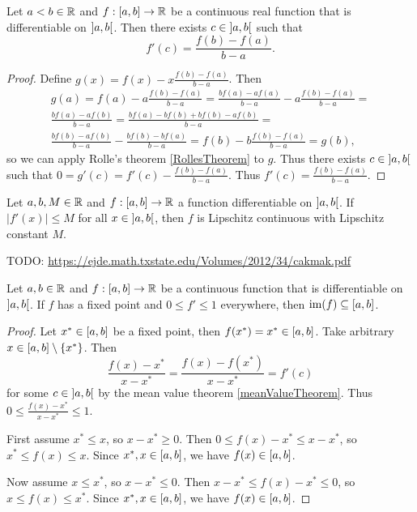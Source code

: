 \begin{theorem} \label{meanValueTheorem}
Let $a<b\in \mathbb{R}$ and $f: \interval{a,b}\to \R$ be a continuous real function that is differentiable on $\interval[o]{a,b}$. Then there exists $c\in \interval[o]{a,b}$ such that
\[f'(c) = \frac{f(b)-f(a)}{b-a}. \]
\end{theorem}
\begin{proof}
Define $g(x) = f(x) - x\frac{f(b)-f(a)}{b-a}$. Then
\begin{multline*}
g(a) = f(a) - a\frac{f(b)-f(a)}{b-a} = \frac{bf(a) - af(a)}{b-a} - a\frac{f(b)-f(a)}{b-a} = \\ \frac{bf(a)-af(b)}{b-a} = \frac{bf(a)-bf(b) + bf(b)-af(b)}{b-a} = \\ \frac{bf(b) - af(b)}{b-a} - \frac{bf(b) - bf(a)}{b-a} = f(b) - b \frac{f(b)-f(a)}{b-a} = g(b),
\end{multline*}
so we can apply Rolle's theorem \ref{RollesTheorem} to $g$. Thus there exists $c\in \interval[o]{a,b}$ such that $0 = g'(c) = f'(c) - \frac{f(b)-f(a)}{b-a}$. Thus $f'(c) = \frac{f(b)-f(a)}{b-a}$.
\end{proof}
\begin{corollary}
Let $a,b, M\in \mathbb{R}$ and $f:\interval{a,b}\to \R$ a function differentiable on $\interval[o]{a,b}$. If $|f'(x)| \leq M$ for all $x\in \interval[o]{a,b}$, then $f$ is Lipschitz continuous with Lipschitz constant $M$.
\end{corollary}

TODO: \url{https://ejde.math.txstate.edu/Volumes/2012/34/cakmak.pdf}

\begin{lemma} \label{boundDerivativeAndFixedPointGivesRange}
Let $a,b\in \mathbb{R}$ and $f:\interval{a,b}\to \R$ be a continuous function that is differentiable on $\interval[o]{a,b}$. If $f$ has a fixed point and $0\leq f' \leq 1$ everywhere, then $\im(f)\subseteq \interval{a,b}$. 
\end{lemma}
\begin{proof}
Let $x^*\in \interval{a,b}$ be a fixed point, then $f(x^*) = x^* \in \interval{a,b}$. Take arbitrary $x\in \interval{a,b}\setminus\{x^*\}$. Then
\[ \frac{f(x) - x^*}{x - x^*} = \frac{f(x) - f(x^*)}{x - x^*} = f'(c) \]
for some $c\in \interval[o]{a,b}$ by the mean value theorem \ref{meanValueTheorem}. Thus $0\leq \frac{f(x) - x^*}{x - x^*} \leq 1$.

First assume $x^* \leq x$, so $x - x^* \geq 0$. Then $0 \leq f(x) - x^* \leq x - x^*$, so $x^* \leq f(x) \leq x$. Since $x^*, x\in \interval{a,b}$, we have $f(x)\in \interval{a,b}$.

Now assume $x\leq x^*$, so $x - x^* \leq 0$. Then $x - x^* \leq f(x) - x^* \leq 0$, so $x \leq f(x) \leq x^*$. Since $x^*, x\in \interval{a,b}$, we have $f(x)\in \interval{a,b}$.
\end{proof}




